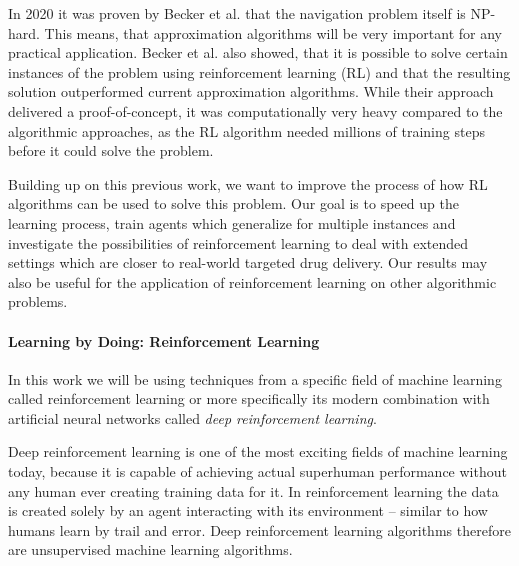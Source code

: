 In 2020 it was proven by Becker et al. \cite{becker2020} that the navigation problem itself is NP-hard. This means, that approximation algorithms will be very important for any practical application. Becker et al. also showed, that it is possible to solve certain instances of the problem using reinforcement learning (RL) and that the resulting solution outperformed current approximation algorithms. While their approach delivered a proof-of-concept, it was computationally very heavy compared to the algorithmic approaches, as the RL algorithm needed millions of training steps before it could solve the problem. 
 
 Building up on this previous work, we want to improve the process of how RL algorithms can be used to solve this problem. Our goal is to speed up the learning process, train agents which generalize for multiple instances and investigate the possibilities of reinforcement learning to deal with extended settings which are closer to real-world targeted drug delivery. Our results may also be useful for the application of reinforcement learning on other algorithmic problems.

 \paragraph{Learning by Doing: Reinforcement Learning} 
In this work we will be using techniques from a specific field of machine learning called reinforcement learning or more specifically its modern combination with artificial neural networks called \textit{deep reinforcement learning}.

 Deep reinforcement learning is one of the most exciting fields of machine learning today, because it is capable of achieving actual superhuman performance without any human ever creating training data for it. In reinforcement learning the data is created solely by an agent interacting with its environment -- similar to how humans learn by trail and error. Deep reinforcement learning algorithms therefore are unsupervised machine learning algorithms.

